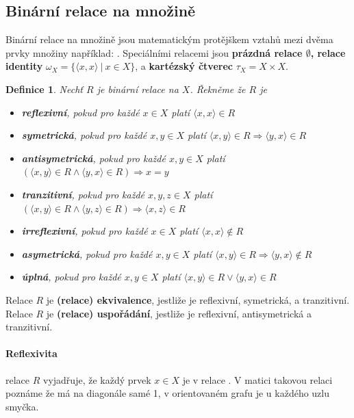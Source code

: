 \documentclass[12pt,a4paper]{article}
\newtheorem{definition}{Definice}
\begin{document}
\subsection{Binární relace na množině}
Binární relace na množině jsou matematickým protějškem vztahů mezi dvěma prvky množiny například: . Speciálními relacemi jsou \textbf{prázdná relace $\emptyset$, relace identity} $\omega_X = \{ \langle x, x \rangle \ | \ x \in X \}$, a \textbf{kartézský čtverec} $\tau_X = X \times X$.

\begin{definition}
Nechť $R$ je binární relace na $X$. Řekněme že $R$ je
\begin{itemize}
	\item \textbf{reflexivní}, pokud pro každé $x \in X$ platí $\langle x, x \rangle \in R$
	\item \textbf{symetrická}, pokud pro každé $x,y \in X$ platí $\langle x, y \rangle \in R \Rightarrow \langle y, x \rangle \in R$
	\item \textbf{antisymetrická}, pokud pro každé $x,y \in X$ platí \\$(\langle x, y \rangle \in R \wedge \langle y, x \rangle \in R) \Rightarrow x = y$
	\item \textbf{tranzitivní}, pokud pro každé $x,y,z \in X$ platí \\$(\langle x, y \rangle \in R \wedge \langle y, z \rangle \in R) \Rightarrow \langle x, z \rangle \in R$
	\item \textbf{irreflexivní}, pokud pro každé $x \in X$ platí $\langle x,x \rangle \not\in R$
	\item \textbf{asymetrická}, pokud pro každé $x,y \in X$ platí $\langle x, y \rangle \in R \Rightarrow \langle y, x \rangle \not\in R$
	\item \textbf{úplná}, pokud pro každé $x,y \in X$ platí $\langle x, y \rangle \in R \vee \langle y, x \rangle \in R$
\end{itemize}
\end{definition}

Relace $R$ je \textbf{(relace) ekvivalence}, jestliže je reflexivní, symetrická, a tranzitivní. Relace $R$ je \textbf{(relace) uspořádání}, jestliže je reflexivní, anti\-symetrická a tranzitivní.

\paragraph{Reflexivita} relace $R$ vyjadřuje, že každý prvek $x \in X$ je v relace . V matici takovou relaci poznáme že má na diagonále samé 1, v orientovaném grafu je u každého uzlu smyčka.
\end{document}
